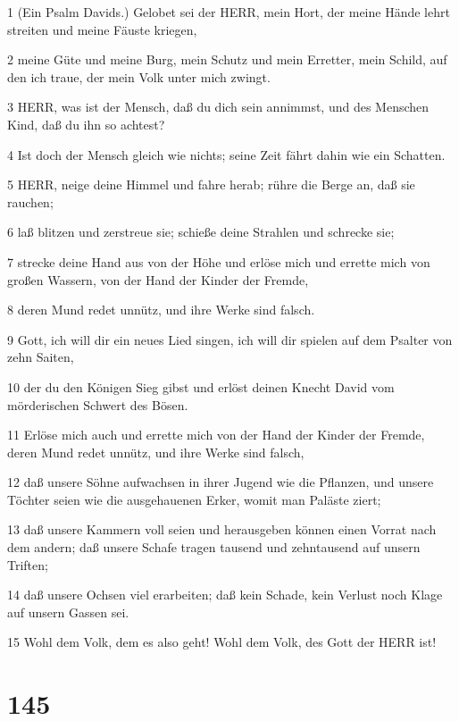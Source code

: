 \par 1 (Ein Psalm Davids.) Gelobet sei der HERR, mein Hort, der meine Hände lehrt streiten und meine Fäuste kriegen,
\par 2 meine Güte und meine Burg, mein Schutz und mein Erretter, mein Schild, auf den ich traue, der mein Volk unter mich zwingt.
\par 3 HERR, was ist der Mensch, daß du dich sein annimmst, und des Menschen Kind, daß du ihn so achtest?
\par 4 Ist doch der Mensch gleich wie nichts; seine Zeit fährt dahin wie ein Schatten.
\par 5 HERR, neige deine Himmel und fahre herab; rühre die Berge an, daß sie rauchen;
\par 6 laß blitzen und zerstreue sie; schieße deine Strahlen und schrecke sie;
\par 7 strecke deine Hand aus von der Höhe und erlöse mich und errette mich von großen Wassern, von der Hand der Kinder der Fremde,
\par 8 deren Mund redet unnütz, und ihre Werke sind falsch.
\par 9 Gott, ich will dir ein neues Lied singen, ich will dir spielen auf dem Psalter von zehn Saiten,
\par 10 der du den Königen Sieg gibst und erlöst deinen Knecht David vom mörderischen Schwert des Bösen.
\par 11 Erlöse mich auch und errette mich von der Hand der Kinder der Fremde, deren Mund redet unnütz, und ihre Werke sind falsch,
\par 12 daß unsere Söhne aufwachsen in ihrer Jugend wie die Pflanzen, und unsere Töchter seien wie die ausgehauenen Erker, womit man Paläste ziert;
\par 13 daß unsere Kammern voll seien und herausgeben können einen Vorrat nach dem andern; daß unsere Schafe tragen tausend und zehntausend auf unsern Triften;
\par 14 daß unsere Ochsen viel erarbeiten; daß kein Schade, kein Verlust noch Klage auf unsern Gassen sei.
\par 15 Wohl dem Volk, dem es also geht! Wohl dem Volk, des Gott der HERR ist!

\chapter{145}

